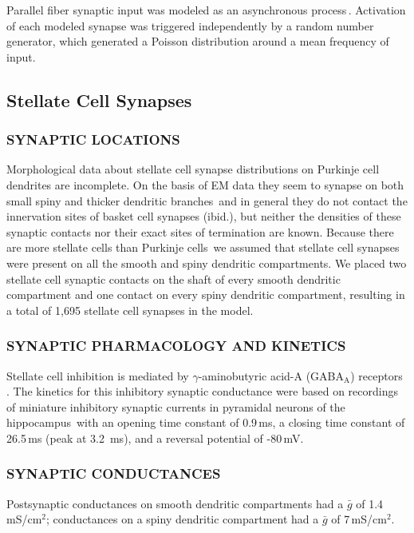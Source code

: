 \documentclass[12pt]{article}
\begin{document}
Parallel fiber synaptic input was modeled
as an asynchronous process\,\cite{Bernard:1991ye}.
Activation of each modeled synapse was triggered independently
by a random number generator, which generated a Poisson distribution
around a mean frequency of input.

\subsection*{Stellate Cell Synapses}

\subsubsection*{SYNAPTIC LOCATIONS}

Morphological data about stellate cell
synapse distributions on Purkinje cell dendrites are incomplete.
On the basis of EM data they seem to synapse on both small spiny
and thicker dendritic branches\,\cite{Palay:1974fk} and
in general they do not contact the innervation sites of basket cell
synapses (ibid.), but neither the densities of these synaptic contacts
nor their exact sites of termination are known. Because there
are more stellate cells than Purkinje cells\,\cite{Ito:1984uq} we assumed
that stellate cell synapses were present on all the smooth and spiny
dendritic compartments. We placed two stellate cell synaptic contacts
on the shaft of every smooth dendritic compartment and one
contact on every spiny dendritic compartment, resulting in a total
of 1,695 stellate cell synapses in the model.

\subsubsection*{SYNAPTIC PHARMACOLOGY AND KINETICS}
Stellate cell inhibition
is mediated by $\gamma$-aminobutyric acid-A (GABA$_{\mbox{A}}$) receptors\,
\cite{Gabbot:1986fk, Ito:1984uq, Llano:1991uq}. The kinetics for
this inhibitory synaptic conductance were based on recordings of
miniature inhibitory synaptic currents in pyramidal neurons of
the hippocampus\,\cite{Ropert:1990kx} with an opening time constant
of 0.9\,ms, a closing time constant of 26.5\,ms (peak at 3.2\,
ms), and a reversal potential of -80\,mV.

\subsubsection*{SYNAPTIC CONDUCTANCES}
Postsynaptic conductances on
smooth dendritic compartments had a $\bar g$ of 1.4\,mS/cm$^2$; conductances
on a spiny dendritic compartment had a $\bar g$ of 7\,mS/cm$^2$.
\end{document}
